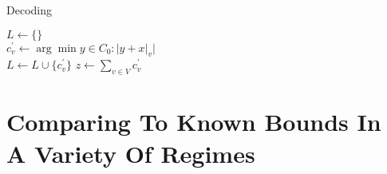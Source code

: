 \documentclass{article}
\begin{document}
\begin{multicols*}{2}
\begin{algorithm}[H]
  \caption{Decoding}
  \label{alg:three}
  $ L \leftarrow \{ \} $\\
   {
    $c^{\prime}_{v} \leftarrow \arg\min { y \in C_{0} : |y + x|_{v} |  } $\\
    $ L \leftarrow  L \cup \{c^{\prime}_{v}\}$
 }
 $ z \leftarrow \sum_{v \in V}{c^{\prime}_{v}} $\\
\end{algorithm}
  \section{Comparing To Known Bounds In A Variety Of Regimes}
  \printbibliography 
\end{multicols*}
\end{document}
